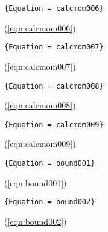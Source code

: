 \begin{verbatim}{Equation = calcmom006}\end{verbatim}
(\ref{eqn:calcmom006})

\begin{verbatim}{Equation = calcmom007}\end{verbatim}
(\ref{eqn:calcmom007})

\begin{verbatim}{Equation = calcmom008}\end{verbatim}
(\ref{eqn:calcmom008})

\begin{verbatim}{Equation = calcmom009}\end{verbatim}
(\ref{eqn:calcmom009})

\begin{verbatim}{Equation = bound001}\end{verbatim}
(\ref{eqn:bound001})

\begin{verbatim}{Equation = bound002}\end{verbatim}
(\ref{eqn:bound002})




